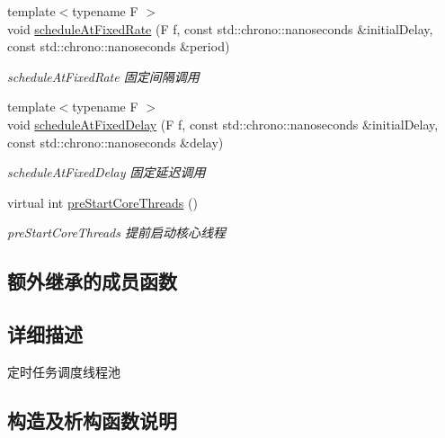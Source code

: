 \begin{DoxyCompactItemize}
{\footnotesize template$<$typename F $>$ }\\void \hyperlink{classScheduledThreadPoolExecutor_aebcb96fcb3f5bfc6e55ffcef9f38d60b}{schedule\+At\+Fixed\+Rate} (F f, const std\+::chrono\+::nanoseconds \&initial\+Delay, const std\+::chrono\+::nanoseconds \&period)
\begin{DoxyCompactList}\small\item\em schedule\+At\+Fixed\+Rate 固定间隔调用 \end{DoxyCompactList}\item 
{\footnotesize template$<$typename F $>$ }\\void \hyperlink{classScheduledThreadPoolExecutor_a594bb3111f9d051ad12f366a13a54db0}{schedule\+At\+Fixed\+Delay} (F f, const std\+::chrono\+::nanoseconds \&initial\+Delay, const std\+::chrono\+::nanoseconds \&delay)
\begin{DoxyCompactList}\small\item\em schedule\+At\+Fixed\+Delay 固定延迟调用 \end{DoxyCompactList}\item 
virtual int \hyperlink{classScheduledThreadPoolExecutor_aed48379bdc243fd07e593205ca28f48d}{pre\+Start\+Core\+Threads} ()
\begin{DoxyCompactList}\small\item\em pre\+Start\+Core\+Threads 提前启动核心线程 \end{DoxyCompactList}\end{DoxyCompactItemize}
\subsection*{额外继承的成员函数}


\subsection{详细描述}
定时任务调度线程池 

\subsection{构造及析构函数说明}
\mbox{\label{classScheduledThreadPoolExecutor_a880b17439bcdcf9b7542925e24033691}} 
